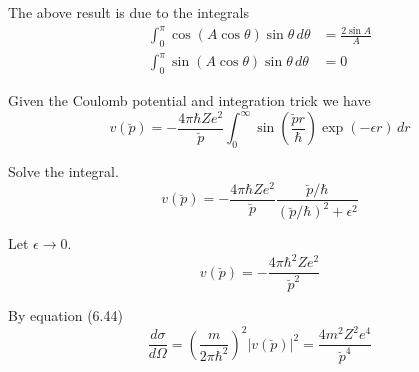 \documentclass[12pt]{article}
\begin{document}
The above result is due to the integrals
\begin{align*}
\int_0^\pi\cos(A\cos\theta)\sin\theta\,d\theta&=\frac{2\sin A}{A}
\\
\int_0^\pi\sin(A\cos\theta)\sin\theta\,d\theta&=0
\end{align*}

Given the Coulomb potential and integration trick we have
\begin{equation*}
v(\breve p)=-\frac{4\pi\hbar Ze^2}{\breve p}
\int_0^\infty\sin\left(\frac{\breve pr}{\hbar}\right)\exp(-\epsilon r)\,dr
\end{equation*}

Solve the integral.
\begin{equation*}
v(\breve p)=-\frac{4\pi\hbar Ze^2}{\breve p}\frac{\breve p/\hbar}{(\breve p/\hbar)^2+\epsilon^2}
\end{equation*}

Let $\epsilon\rightarrow0$.
\begin{equation*}
v(\breve p)=-\frac{4\pi\hbar^2Ze^2}{\breve p^2}
\end{equation*}

By equation (6.44)
\begin{equation*}
\frac{d\sigma}{d\Omega}=\left(\frac{m}{2\pi\hbar^2}\right)^2
|v(\breve p)|^2
=\frac{4m^2Z^2e^4}{\breve p^4}
\end{equation*}
\end{document}
